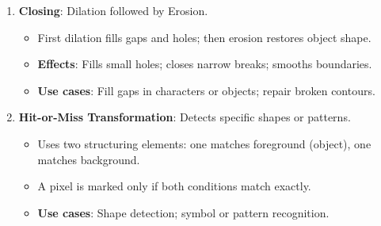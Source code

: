 \documentclass[11pt,a4paper]{article}
\begin{document}
\begin{enumerate}
    \item \textbf{Closing}: Dilation followed by Erosion.
    \begin{itemize}
        \item First dilation fills gaps and holes; then erosion restores object shape.
        \item \textbf{Effects}: Fills small holes; closes narrow breaks; smooths boundaries.
        \item \textbf{Use cases}: Fill gaps in characters or objects; repair broken contours.
    \end{itemize}

    \item \textbf{Hit-or-Miss Transformation}: Detects specific shapes or patterns.
    \begin{itemize}
        \item Uses two structuring elements: one matches foreground (object), one matches background.
        \item A pixel is marked only if both conditions match exactly.
        \item \textbf{Use cases}: Shape detection; symbol or pattern recognition.
    \end{itemize}
\end{enumerate}
\end{document}
